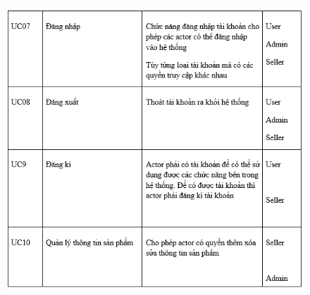 \documentclass{article}
\begin{document}
\begin{center}
	\begin{figure}[htp]
		\begin{center}
		
			\includegraphics[scale=.930]{anh6.png}
			
		\end{center}
	
		
	\end{figure}
\end{center}
\newpage
\end{document}
